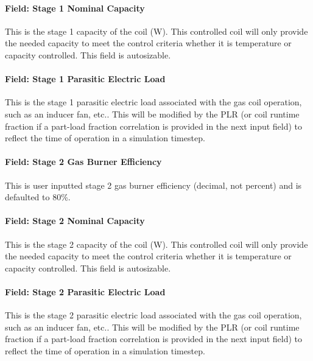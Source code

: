 \paragraph{Field: Stage 1 Nominal Capacity}\label{field-stage-1-nominal-capacity-1}

This is the stage 1 capacity of the coil (W). This controlled coil will only provide the needed capacity to meet the control criteria whether it is temperature or capacity controlled. This field is autosizable.

\paragraph{Field: Stage 1 Parasitic Electric Load}\label{field-stage-1-parasitic-electric-load}

This is the stage 1 parasitic electric load associated with the gas coil operation, such as an inducer fan, etc.. This will be modified by the PLR (or coil runtime fraction if a part-load fraction correlation is provided in the next input field) to reflect the time of operation in a simulation timestep.

\paragraph{Field: Stage 2 Gas Burner Efficiency}\label{field-stage-2-gas-burner-efficiency}

This is user inputted stage 2 gas burner efficiency (decimal, not percent) and is defaulted to 80\%.

\paragraph{Field: Stage 2 Nominal Capacity}\label{field-stage-2-nominal-capacity-1}

This is the stage 2 capacity of the coil (W). This controlled coil will only provide the needed capacity to meet the control criteria whether it is temperature or capacity controlled. This field is autosizable.

\paragraph{Field: Stage 2 Parasitic Electric Load}\label{field-stage-2-parasitic-electric-load}

This is the stage 2 parasitic electric load associated with the gas coil operation, such as an inducer fan, etc.. This will be modified by the PLR (or coil runtime fraction if a part-load fraction correlation is provided in the next input field) to reflect the time of operation in a simulation timestep.

